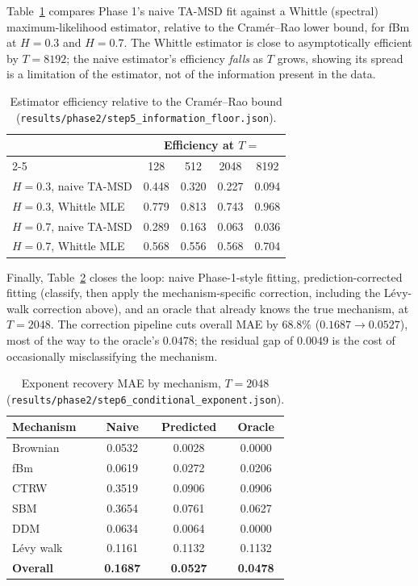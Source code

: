 \documentclass[11pt]{article}
\newcommand{\code}[1]{\texttt{#1}}
\begin{document}
Table~\ref{tab:whittle} compares Phase 1's naive TA-MSD fit against a Whittle
(spectral) maximum-likelihood estimator, relative to the Cram\'er--Rao lower
bound, for fBm at $H{=}0.3$ and $H{=}0.7$. The Whittle estimator is close to
asymptotically efficient by $T{=}8192$; the naive estimator's efficiency
\emph{falls} as $T$ grows, showing its spread is a limitation of the
estimator, not of the information present in the data.

\begin{table}[htbp]
\centering
\caption{Estimator efficiency relative to the Cram\'er--Rao bound
(\code{results/phase2/step5\_information\_floor.json}).}
\label{tab:whittle}
\begin{tabular}{lcccc}
\toprule
& \multicolumn{4}{c}{Efficiency at $T=$} \\
\cmidrule(lr){2-5}
& 128 & 512 & 2048 & 8192 \\
\midrule
$H{=}0.3$, naive TA-MSD & 0.448 & 0.320 & 0.227 & 0.094 \\
$H{=}0.3$, Whittle MLE & 0.779 & 0.813 & 0.743 & 0.968 \\
$H{=}0.7$, naive TA-MSD & 0.289 & 0.163 & 0.063 & 0.036 \\
$H{=}0.7$, Whittle MLE & 0.568 & 0.556 & 0.568 & 0.704 \\
\bottomrule
\end{tabular}
\end{table}

Finally, Table~\ref{tab:exponent-mae} closes the loop: naive
Phase-1-style fitting, prediction-corrected fitting (classify, then apply the
mechanism-specific correction, including the L\'evy-walk correction above),
and an oracle that already knows the true mechanism, at $T{=}2048$. The
correction pipeline cuts overall MAE by $68.8\%$
($0.1687\to0.0527$), most of the way to the oracle's $0.0478$; the residual
gap of $0.0049$ is the cost of occasionally misclassifying the mechanism.

\begin{table}[htbp]
\centering
\caption{Exponent recovery MAE by mechanism, $T{=}2048$
(\code{results/phase2/step6\_conditional\_exponent.json}).}
\label{tab:exponent-mae}
\begin{tabular}{lccc}
\toprule
Mechanism & Naive & Predicted & Oracle \\
\midrule
Brownian & 0.0532 & 0.0028 & 0.0000 \\
fBm & 0.0619 & 0.0272 & 0.0206 \\
CTRW & 0.3519 & 0.0906 & 0.0906 \\
SBM & 0.3654 & 0.0761 & 0.0627 \\
DDM & 0.0634 & 0.0064 & 0.0000 \\
L\'evy walk & 0.1161 & 0.1132 & 0.1132 \\
\midrule
\textbf{Overall} & \textbf{0.1687} & \textbf{0.0527} & \textbf{0.0478} \\
\bottomrule
\end{tabular}
\end{table}
\end{document}
